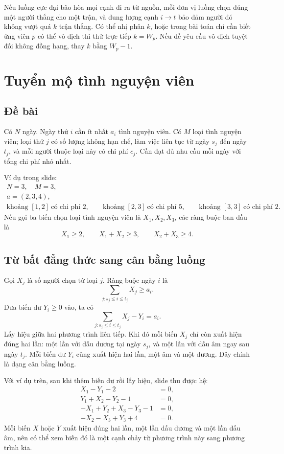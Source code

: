 \documentclass[11pt]{article}
\begin{document}
Nếu luồng cực đại bão hòa mọi cạnh đi ra từ nguồn, mỗi đơn vị luồng chọn đúng
một người thắng cho một trận, và dung lượng cạnh \(i\to t\) bảo đảm người đó
không vượt quá \(k\) trận thắng. Có thể nhị phân \(k\), hoặc trong bài toán
chỉ cần biết ứng viên \(p\) có thể vô địch thì thử trực tiếp \(k=W_p\). Nếu đề
yêu cầu vô địch tuyệt đối không đồng hạng, thay \(k\) bằng \(W_p-1\).

\section{Tuyển mộ tình nguyện viên}

\subsection*{Đề bài}

Có $N$ ngày. Ngày thứ $i$ cần ít nhất \(a_i\) tình nguyện viên. Có \(M\) loại
tình nguyện viên; loại thứ \(j\) có số lượng không hạn chế, làm việc liên tục
từ ngày \(s_j\) đến ngày \(t_j\), và mỗi người thuộc loại này có chi phí
\(c_j\). Cần đạt đủ nhu cầu mỗi ngày với tổng chi phí nhỏ nhất.

Ví dụ trong slide:
\[
\begin{array}{l}
N=3,\quad M=3,\\
a=(2,3,4),\\
\text{khoảng }[1,2]\ \text{có chi phí }2,\qquad
\text{khoảng }[2,3]\ \text{có chi phí }5,\qquad
\text{khoảng }[3,3]\ \text{có chi phí }2.
\end{array}
\]
Nếu gọi ba biến chọn loại tình nguyện viên là \(X_1,X_2,X_3\), các ràng buộc
ban đầu là
\[
  X_1\ge 2,\qquad X_1+X_2\ge 3,\qquad X_2+X_3\ge 4.
\]

\subsection*{Từ bất đẳng thức sang cân bằng luồng}

Gọi \(X_j\) là số người chọn từ loại \(j\). Ràng buộc ngày \(i\) là
\[
  \sum_{j:s_j\le i\le t_j} X_j \ge a_i.
\]
Đưa biến dư \(Y_i\ge 0\) vào, ta có
\[
  \sum_{j:s_j\le i\le t_j} X_j - Y_i = a_i.
\]
Lấy hiệu giữa hai phương trình liên tiếp. Khi đó mỗi biến \(X_j\) chỉ còn
xuất hiện đúng hai lần: một lần với dấu dương tại ngày \(s_j\), và một lần
với dấu âm ngay sau ngày \(t_j\). Mỗi biến dư \(Y_i\) cũng xuất hiện hai lần,
một âm và một dương. Đây chính là dạng cân bằng luồng.

Với ví dụ trên, sau khi thêm biến dư rồi lấy hiệu, slide thu được hệ:
\[
\begin{aligned}
X_1-Y_1-2&=0,\\
Y_1+X_2-Y_2-1&=0,\\
-X_1+Y_2+X_3-Y_3-1&=0,\\
-X_2-X_3+Y_3+4&=0.
\end{aligned}
\]
Mỗi biến \(X\) hoặc \(Y\) xuất hiện đúng hai lần, một lần dấu dương và một
lần dấu âm, nên có thể xem biến đó là một cạnh chảy từ phương trình này sang
phương trình kia.
\end{document}
